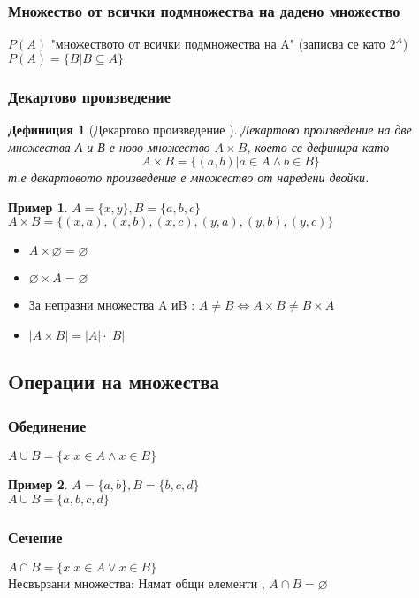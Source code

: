 \documentclass[fleqn, 12pt]{article}
\newtheorem{example}{Пример}[subsection]
\newtheorem{definition}{Дефиниция}[subsection]
\begin{document}
\subsubsection{Множество от всички подмножества на дадено множество}
$P(A)$ "множеството от всички подмножества на A" (записва се като $2^A$)\\
$P(A) = \{B | B\subseteq A \}$

\subsubsection{Декартово произведение}
\begin{definition}[Декартово произведение ]
Декартово произведение на две множества А и В е ново множество $A \times B$, което се дефинира като
$$A \times B = \{(a,b) | a\in A \land b \in B \}$$
т.е декартовото произведение е множество от наредени двойки. 
\end{definition}

\begin{example}
$A = \{x, y\}, B = \{a, b, c\}$\\
$A \times B = \{(x, a), (x, b), (x, c), (y, a), (y, b), (y, c)\}$
\end{example}
 
\begin{itemize}
	\item $A \times \varnothing = \varnothing$
	\item $\varnothing \times A = \varnothing$
	\item За непразни множества A иB : $A\neq B \Leftrightarrow A \times B \neq B \times A$
	\item $|A \times B| = |A|\cdot |B|$
\end{itemize}

\subsection {Oперации на множества} 
 
\subsubsection{Обединение}
$A \cup B = \{x | x\in A \land x \in B\}$
\begin{example}
$A = \{a, b\}, B = \{b, c, d\}$\\
$A \cup B = \{a, b, c, d\}$
\end{example}

\subsubsection{Сечение}
$A \cap B = \{x | x\in A \lor x \in B\}$\\
Несвързани множества: Нямат общи елементи , $A \cap B = \varnothing$
\end{document}
